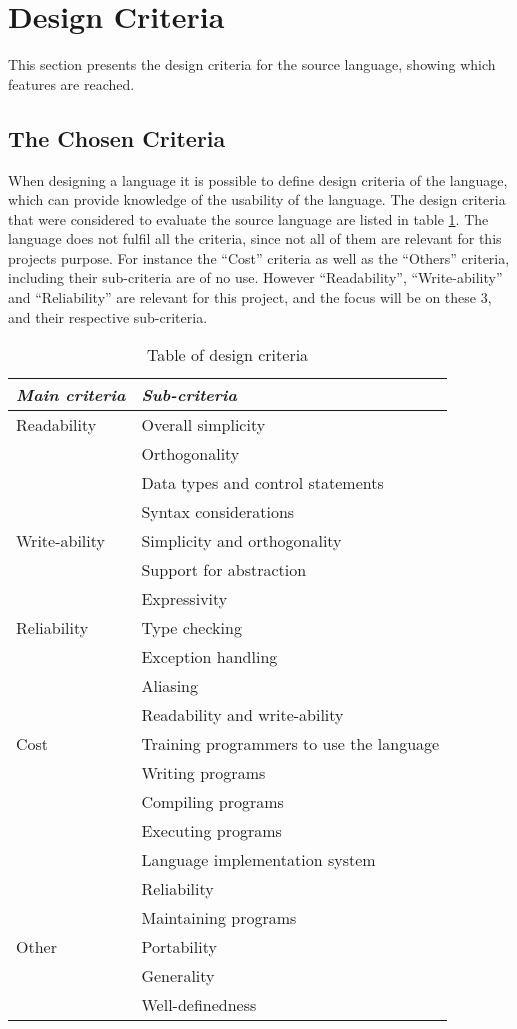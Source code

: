 \chapter{Design Criteria}\label{chap:design-criteria}
This section presents the design criteria for the source language, showing which features are reached. 

\section{The Chosen Criteria}
When designing a language it is possible to define design criteria of the language, which can provide knowledge of the usability of the language. The design criteria that were considered to evaluate the source language are listed in table \ref{chap:design-criteria}. The language does not fulfil all the criteria, since not all of them are relevant for this projects purpose. For instance the ``Cost'' criteria as well as the ``Others'' criteria, including their sub-criteria are of no use. However ``Readability'', ``Write-ability'' and ``Reliability'' are relevant for this project, and the focus will be on these 3, and their respective sub-criteria.

\begin{table}[H]
	\center
	\begin{tabular}{|l|l|}
	\hline
	\emph{Main criteria} & \emph{Sub-criteria} \\ 
 		\hline
 		Readability & Overall simplicity \\
 		 & Orthogonality \\
 		 & Data types and control statements \\
 		 & Syntax considerations \\
 		\hline
 		Write-ability & Simplicity and orthogonality  \\
 		 & Support for abstraction \\
 		 & Expressivity \\
 		\hline
 		Reliability & Type checking \\
 		 & Exception handling \\
 		 & Aliasing \\
 		 & Readability and write-ability \\
 		\hline
 		Cost & Training programmers to use the language \\
 		 & Writing programs \\
 		 & Compiling programs \\
 		 & Executing programs \\
 		 & Language implementation system \\
 		 & Reliability \\
 		 & Maintaining programs \\
 		\hline
 		Other & Portability \\
 		 & Generality \\
 		 & Well-definedness \\
 		\hline
	\end{tabular}
	\label{tab:design}
	\caption{Table of design criteria}
\end{table} 

